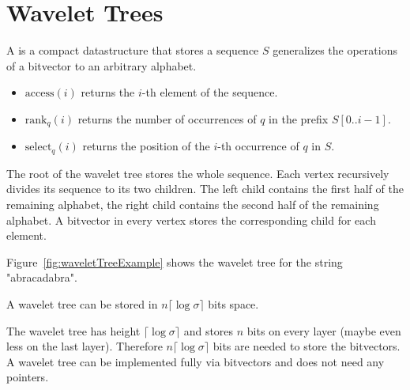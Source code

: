 \section{Wavelet Trees}

\begin{Definition}
  A  is a compact datastructure that stores a sequence $S$ generalizes the operations of a bitvector to an arbitrary alphabet.
  \begin{itemize}
    \item $\mathrm{access}(i)$ returns the $i$-th element of the sequence.
    \item $\mathrm{rank}_q(i)$ returns the number of occurrences of $q$ in the prefix $S[0..i-1]$.
    \item $\mathrm{select}_q(i)$ returns the position of the $i$-th occurrence of $q$ in $S$.
  \end{itemize}

  The root of the wavelet tree stores the whole sequence. Each vertex recursively divides its sequence to its two children. The left child contains the first half of the remaining alphabet, the right child contains the second half of the remaining alphabet. A bitvector in every vertex stores the corresponding child for each element.
\end{Definition}

\begin{Example}
  Figure~\ref{fig:waveletTreeExample} shows the wavelet tree for the string "abracadabra".
\end{Example}

\begin{Lemma}
  A wavelet tree can be stored in $n\lceil\log\sigma\rceil$ bits space.
\end{Lemma}

\begin{Proof}
  The wavelet tree has height $\lceil\log\sigma\rceil$ and stores $n$ bits on every layer (maybe even less on the last layer). Therefore $n\lceil\log\sigma\rceil$ bits are needed to store the bitvectors. A wavelet tree can be implemented fully via bitvectors and does not need any pointers.
\end{Proof}

